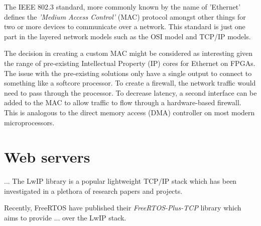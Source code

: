 The IEEE 802.3 standard\cite{IEEE802.3-2012}, more commonly known by the name of 'Ethernet' defines the \textit{'Medium Access Control'} (MAC) 
protocol amongst other things for two or more devices to communicate over a network. This standard is just one part in the layered network 
models such as the OSI model and TCP/IP models. 






The decision in creating a custom MAC might be considered as interesting given the range of pre-existing Intellectual 
Property (IP) cores for Ethernet on FPGAs. The issue with the pre-existing solutions only have a single output to connect to something like a softcore
processor. To create a firewall, the network traffic would need to pass through the processor. To decrease latency, a second interface can be added 
to the MAC to allow traffic to flow through a hardware-based firewall. This is analogous to the direct memory access (DMA) controller on most modern 
microprocessors. 




\section{Web servers}
... The LwIP library is a popular lightweight TCP/IP stack which has been investigated in a plethora of research papers and projects. 


Recently, FreeRTOS have published their \textit{FreeRTOS-Plus-TCP} library which aims to provide ... over the LwIP stack. 






